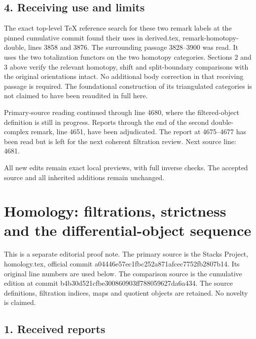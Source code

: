 \documentclass[11pt]{article}
\begin{document}
\subsection{4. Receiving use and limits}\label{note-04-receiving-use-and-limits}

The exact top-level TeX reference search for these two remark labels at the pinned cumulative commit found their uses in derived.tex, remark-homotopy-double, lines 3858 and 3876. The surrounding passage 3828--3900 was read. It uses the two totalization functors on the two homotopy categories. Sections 2 and 3 above verify the relevant homotopy, shift and split-boundary comparisons with the original orientations intact. No additional body correction in that receiving passage is required. The foundational construction of its triangulated categories is not claimed to have been reaudited in full here.

Primary-source reading continued through line 4680, where the filtered-object definition is still in progress. Reports through the end of the second double-complex remark, line 4651, have been adjudicated. The report at 4675--4677 has been read but is left for the next coherent filtration review. Next source line: 4681.

All new edits remain exact local previews, with full inverse checks. The accepted source and all inherited additions remain unchanged.
\clearpage
\section{Homology: filtrations, strictness and the differential-object sequence}\label{note-05-homology-filtrations-strictness-and-the-differential-object-sequence}

This is a separate editorial proof note. The primary source is the Stacks Project, homology.tex, official commit a04446e5\allowbreak{}7ec1fbc2\allowbreak{}52a871af\allowbreak{}cec7752f\allowbreak{}b2807b14. Its original line numbers are used below. The comparison source is the cumulative edition at commit b4b30d52\allowbreak{}1cfbe300\allowbreak{}860903ff\allowbreak{}78805962\allowbreak{}7da6a434. The source definitions, filtration indices, maps and quotient objects are retained. No novelty is claimed.

\subsection{1. Received reports}\label{note-05-received-reports}
\end{document}
